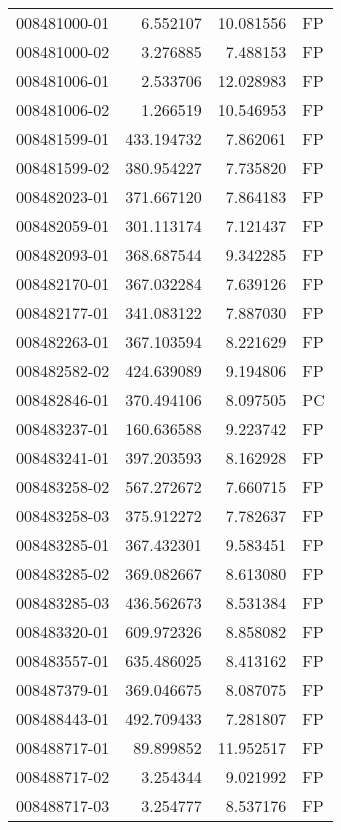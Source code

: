 \begin{tabular}{lrrl}
008481000-01 &    6.552107 &      10.081556 &   FP \\
008481000-02 &    3.276885 &       7.488153 &   FP \\
008481006-01 &    2.533706 &      12.028983 &   FP \\
008481006-02 &    1.266519 &      10.546953 &   FP \\
008481599-01 &  433.194732 &       7.862061 &   FP \\
008481599-02 &  380.954227 &       7.735820 &   FP \\
008482023-01 &  371.667120 &       7.864183 &   FP \\
008482059-01 &  301.113174 &       7.121437 &   FP \\
008482093-01 &  368.687544 &       9.342285 &   FP \\
008482170-01 &  367.032284 &       7.639126 &   FP \\
008482177-01 &  341.083122 &       7.887030 &   FP \\
008482263-01 &  367.103594 &       8.221629 &   FP \\
008482582-02 &  424.639089 &       9.194806 &   FP \\
008482846-01 &  370.494106 &       8.097505 &   PC \\
008483237-01 &  160.636588 &       9.223742 &   FP \\
008483241-01 &  397.203593 &       8.162928 &   FP \\
008483258-02 &  567.272672 &       7.660715 &   FP \\
008483258-03 &  375.912272 &       7.782637 &   FP \\
008483285-01 &  367.432301 &       9.583451 &   FP \\
008483285-02 &  369.082667 &       8.613080 &   FP \\
008483285-03 &  436.562673 &       8.531384 &   FP \\
008483320-01 &  609.972326 &       8.858082 &   FP \\
008483557-01 &  635.486025 &       8.413162 &   FP \\
008487379-01 &  369.046675 &       8.087075 &   FP \\
008488443-01 &  492.709433 &       7.281807 &   FP \\
008488717-01 &   89.899852 &      11.952517 &   FP \\
008488717-02 &    3.254344 &       9.021992 &   FP \\
008488717-03 &    3.254777 &       8.537176 &   FP \\

\end{tabular}
